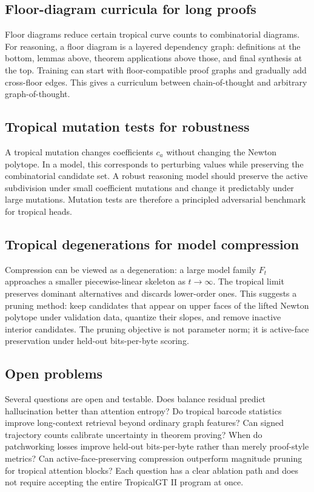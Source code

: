 \documentclass[11pt]{article}
\begin{document}
\subsection{Floor-diagram curricula for long proofs}

Floor diagrams reduce certain tropical curve counts to combinatorial diagrams.  For reasoning, a floor diagram is a layered dependency graph: definitions at the bottom, lemmas above, theorem applications above those, and final synthesis at the top.  Training can start with floor-compatible proof graphs and gradually add cross-floor edges.  This gives a curriculum between chain-of-thought and arbitrary graph-of-thought.

\subsection{Tropical mutation tests for robustness}

A tropical mutation changes coefficients \(c_a\) without changing the Newton polytope.  In a model, this corresponds to perturbing values while preserving the combinatorial candidate set.  A robust reasoning model should preserve the active subdivision under small coefficient mutations and change it predictably under large mutations.  Mutation tests are therefore a principled adversarial benchmark for tropical heads.

\subsection{Tropical degenerations for model compression}

Compression can be viewed as a degeneration: a large model family \(F_t\) approaches a smaller piecewise-linear skeleton as \(t\to\infty\).  The tropical limit preserves dominant alternatives and discards lower-order ones.  This suggests a pruning method: keep candidates that appear on upper faces of the lifted Newton polytope under validation data, quantize their slopes, and remove inactive interior candidates.  The pruning objective is not parameter norm; it is active-face preservation under held-out bits-per-byte scoring.

\subsection{Open problems}

Several questions are open and testable.  Does balance residual predict hallucination better than attention entropy?  Do tropical barcode statistics improve long-context retrieval beyond ordinary graph features?  Can signed trajectory counts calibrate uncertainty in theorem proving?  When do patchworking losses improve held-out bits-per-byte rather than merely proof-style metrics?  Can active-face-preserving compression outperform magnitude pruning for tropical attention blocks?  Each question has a clear ablation path and does not require accepting the entire TropicalGT II program at once.
\end{document}
